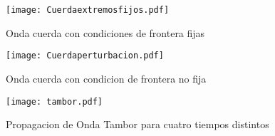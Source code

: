 \documentclass[12pt]{article}
\begin{document}
	\begin{figure}[h]
		\centering
		\texttt{[image: Cuerdaextremosfijos.pdf]}
		\caption{Onda cuerda con condiciones de frontera fijas}
		\label{fig:anticitera}
	\end{figure} 
\begin{figure}[h]
		\centering
		\texttt{[image: Cuerdaperturbacion.pdf]}
		\caption{Onda cuerda con condicion de frontera no fija}
		\label{fig:anticitera}
	\end{figure} 
\begin{figure}[h]
		\centering
		\texttt{[image: tambor.pdf]}
		\caption{Propagacion de Onda Tambor para cuatro tiempos distintos}
		\label{fig:anticitera}
	\end{figure} 
\end{document}
